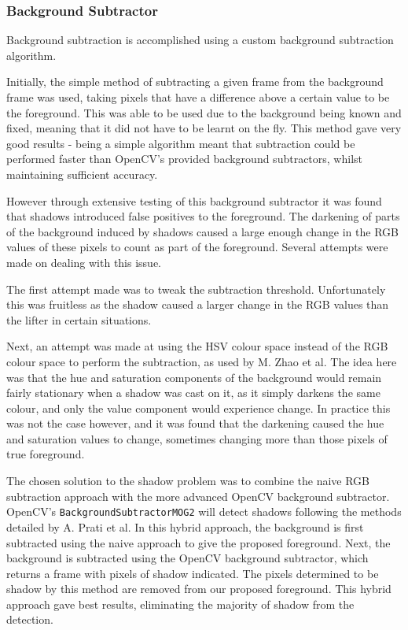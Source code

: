 \subsubsection{Background Subtractor}
\label{subsec:bgsub}

Background subtraction is accomplished using a custom background subtraction algorithm.

Initially, the simple method of subtracting a given frame from the background frame was used, taking pixels that have a difference above a certain value to be the foreground. This was able to be used due to the background being known and fixed, meaning that it did not have to be learnt on the fly. This method gave very good results - being a simple algorithm meant that subtraction could be performed faster than OpenCV's provided background subtractors, whilst maintaining sufficient accuracy.

However through extensive testing of this background subtractor it was found that shadows introduced false positives to the foreground. The darkening of parts of the background induced by shadows caused a large enough change in the RGB values of these pixels to count as part of the foreground. Several attempts were made on dealing with this issue.

The first attempt made was to tweak the subtraction threshold. Unfortunately this was fruitless as the shadow caused a larger change in the RGB values than the lifter in certain situations.

Next, an attempt was made at using the HSV colour space instead of the RGB colour space to perform the subtraction, as used by M. Zhao et al\cite{bgsubhsv}. The idea here was that the hue and saturation components of the background would remain fairly stationary when a shadow was cast on it, as it simply darkens the same colour, and only the value component would experience change. In practice this was not the case however, and it was found that the darkening caused the hue and saturation values to change, sometimes changing more than those pixels of true foreground.

The chosen solution to the shadow problem was to combine the naive RGB subtraction approach with the more advanced OpenCV background subtractor. OpenCV's \texttt{Background\allowbreak SubtractorMOG2} will detect shadows following the methods detailed by A. Prati et al\cite{bgsubmog2}. In this hybrid approach, the background is first subtracted using the naive approach to give the proposed foreground. Next, the background is subtracted using the OpenCV background subtractor, which returns a frame with pixels of shadow indicated. The pixels determined to be shadow by this method are removed from our proposed foreground. This hybrid approach gave best results, eliminating the majority of shadow from the detection.

